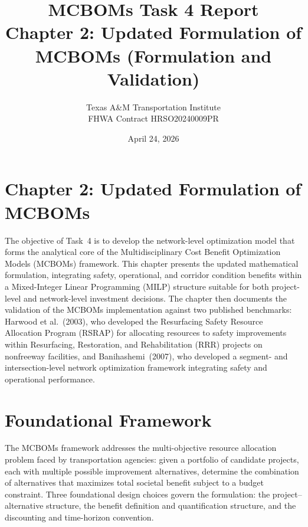 \title{MCBOMs Task 4 Report \\ \large Chapter 2: Updated Formulation of MCBOMs (Formulation and Validation)}
\author{Texas A\&M Transportation Institute \\ FHWA Contract HRSO20240009PR}
\date{April 24, 2026}



\maketitle

\tableofcontents
\newpage


\section*{Chapter 2: Updated Formulation of MCBOMs}

The objective of Task~4 is to develop the network-level optimization model that
forms the analytical core of the Multidisciplinary Cost Benefit Optimization
Models (MCBOMs) framework. This chapter presents the updated mathematical
formulation, integrating safety, operational, and corridor condition benefits
within a Mixed-Integer Linear Programming (MILP) structure suitable for both
project-level and network-level investment decisions. The chapter then documents
the validation of the MCBOMs implementation against two published benchmarks:
Harwood et al.~(2003), who developed the Resurfacing Safety Resource
Allocation Program (RSRAP) for allocating resources to safety improvements
within Resurfacing, Restoration, and Rehabilitation (RRR) projects on
nonfreeway facilities, and Banihashemi~(2007), who developed a segment- and
intersection-level network optimization framework integrating safety and
operational performance.

\setcounter{section}{0}
\section{Foundational Framework}

The MCBOMs framework addresses the multi-objective resource allocation problem
faced by transportation agencies: given a portfolio of candidate projects, each
with multiple possible improvement alternatives, determine the combination of
alternatives that maximizes total societal benefit subject to a budget
constraint. Three foundational design choices govern the formulation: the
project--alternative structure, the benefit definition and quantification
structure, and the discounting and time-horizon convention.

